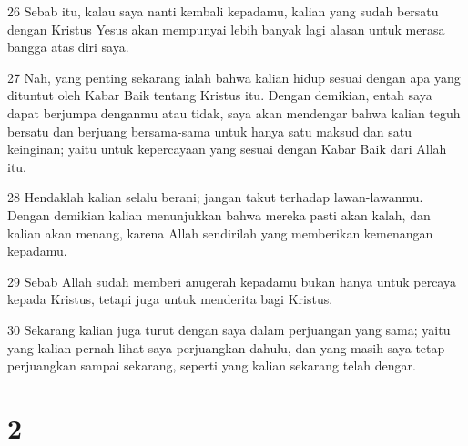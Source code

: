 \par 26 Sebab itu, kalau saya nanti kembali kepadamu, kalian yang sudah bersatu dengan Kristus Yesus akan mempunyai lebih banyak lagi alasan untuk merasa bangga atas diri saya.
\par 27 Nah, yang penting sekarang ialah bahwa kalian hidup sesuai dengan apa yang dituntut oleh Kabar Baik tentang Kristus itu. Dengan demikian, entah saya dapat berjumpa denganmu atau tidak, saya akan mendengar bahwa kalian teguh bersatu dan berjuang bersama-sama untuk hanya satu maksud dan satu keinginan; yaitu untuk kepercayaan yang sesuai dengan Kabar Baik dari Allah itu.
\par 28 Hendaklah kalian selalu berani; jangan takut terhadap lawan-lawanmu. Dengan demikian kalian menunjukkan bahwa mereka pasti akan kalah, dan kalian akan menang, karena Allah sendirilah yang memberikan kemenangan kepadamu.
\par 29 Sebab Allah sudah memberi anugerah kepadamu bukan hanya untuk percaya kepada Kristus, tetapi juga untuk menderita bagi Kristus.
\par 30 Sekarang kalian juga turut dengan saya dalam perjuangan yang sama; yaitu yang kalian pernah lihat saya perjuangkan dahulu, dan yang masih saya tetap perjuangkan sampai sekarang, seperti yang kalian sekarang telah dengar.

\chapter{2}

